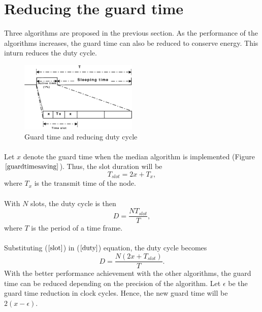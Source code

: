 \documentclass[a4paper,10pt]{report}
\begin{document}
\section{\textbf{Reducing the guard time}}
Three algorithms are proposed in the previous section. As the
performance of the algorithms increases, the guard time can also be
reduced to conserve energy. This inturn reduces the duty cycle.
\begin{figure}[b]
\centering
\includegraphics[width=0.5\textwidth]{guardtimesaving}
\caption{Guard time and reducing duty cycle} \label{guardtimesaving}
\end{figure}
\paragraph*{}
Let $x$ denote the guard time when the median algorithm is implemented (Figure $\ref{guardtimesaving}$). Thus, the slot
duration will be
\begin{equation}
T_{slot}=2x + T_x ,
\label{slot}
\end{equation}
where $T_x$ is the transmit time of the node.
\paragraph*{}
With $N$ slots, the duty cycle is then
\begin{equation}
D = \dfrac{NT_{slot}}{T}, \label{duty}
\end{equation}
where $T$ is the period of a time frame. \paragraph*{} Substituting ($\ref{slot}$) in ($\ref{duty}$) equation, the duty cycle becomes
\begin{equation}
D= \dfrac{N(2x+T_{slot})}{T}.
\end{equation}
With the better performance achievement with the other algorithms,
the guard time can be reduced depending on the precision of the
algorithm. Let $\epsilon$ be the guard time reduction in clock
cycles. Hence, the new guard time will be $2(x-\epsilon)$.
\end{document}
